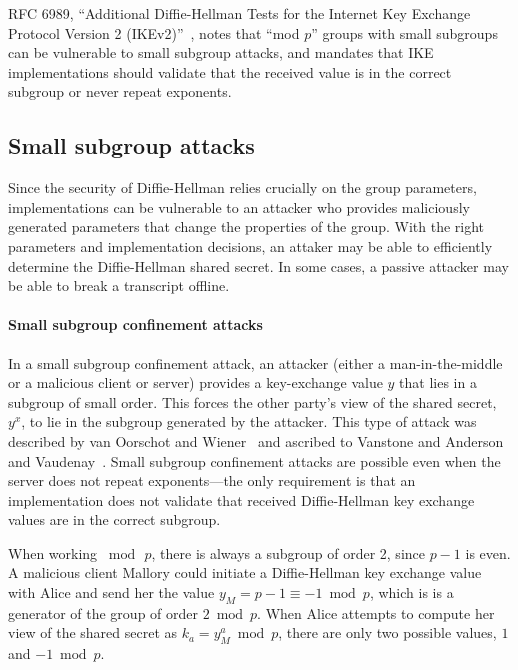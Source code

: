 RFC 6989, ``Additional Diffie-Hellman Tests for the Internet Key Exchange
Protocol Version 2 (IKEv2)''~\cite{rfc6989}, notes that ``mod $p$'' groups with
small subgroups can be vulnerable to small subgroup attacks, and mandates that
IKE implementations should validate that the received value is in the correct
subgroup or never repeat exponents.

\subsection{Small subgroup attacks}
\label{subsec:small-subgroup-attack}

Since the security of Diffie-Hellman relies crucially on the group parameters,
implementations can be vulnerable to an attacker who provides maliciously
generated parameters that change the properties of the group. 
With the right parameters and implementation decisions, an attaker may be able
to efficiently determine the Diffie-Hellman shared secret. In some cases, a
passive attacker may be able to break a transcript offline.

\paragraph{Small subgroup confinement attacks}
In a small subgroup confinement attack, an attacker (either a man-in-the-middle
or a malicious client or server) provides a key-exchange value $y$ that lies in a
subgroup of small order.  This forces the other party's view of the shared
secret, $y^x$, to lie in the subgroup generated by the attacker.  This
type of attack was described by van Oorschot and Wiener~\cite{van1996diffie}
and ascribed to Vanstone and Anderson and Vaudenay~\cite{anderson-1996}.  Small
subgroup confinement attacks are possible even when the server does not repeat
exponents---the only requirement is that an implementation does not validate
that received Diffie-Hellman key exchange values are in the correct subgroup.


When working $\bmod\,p$, there is always a subgroup of order 2, since $p-1$ is
even. A malicious client Mallory could initiate a Diffie-Hellman key exchange
value with Alice and send her the value $y_M = p-1 \equiv -1 \bmod p$, which is
is a generator of the group of order $2 \bmod p$.  When Alice attempts to
compute her view of the shared secret as $k_a = y_M^a \bmod p$, there are only
two possible values, $1$ and $-1 \bmod p$.

